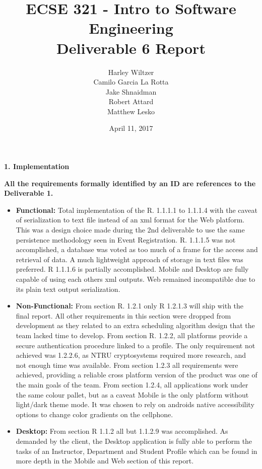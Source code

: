 \documentclass[12pt]{article}
\title{ECSE 321 - Intro to Software Engineering\\Deliverable 6 Report}
\author{Harley Wiltzer\\Camilo Garcia La Rotta\\Jake Shnaidman\\Robert Attard\\Matthew Lesko}
\date{April 11, 2017}
\begin{document}
\maketitle
\newpage
{} %

\newpage
\textbf{1. Implementation}


\textbf{All the requirements formally identified by an ID are references to the Deliverable 1.}
\begin{itemize}

    \item \textbf{Functional:} Total implementation of the R. 1.1.1.1 to 1.1.1.4 with the caveat of serialization to text file instead of an xml format for the Web platform. This was a design choice made during the 2nd deliverable to use the same persistence methodology seen in Event Registration. R. 1.1.1.5 was not accomplished, a database was voted as too much of a frame for the access and retrieval of data. A much lightweight approach of storage in text files was preferred. R 1.1.1.6 is partially accomplished. Mobile and Desktop are fully capable of using each others xml outputs. Web remained incompatible due to its plain text output serialization.
        
	\item \textbf{Non-Functional:} From section R. 1.2.1 only R 1.2.1.3 will ship with the final
		report. All other requirements in this section were dropped from development as they related
		to an extra scheduling algorithm design that the team lacked time to develop.
	From section R. 1.2.2, all platforms provide a secure authentication procedure linked to a
	profile. The only requirement not achieved was 1.2.2.6, as NTRU cryptosystems required more
	research, and not enough time was available. From section 1.2.3 all requirements were achieved,
	providing a reliable cross platform version of the product was one of the main goals of the
	team. From section 1.2.4, all applications work under the same colour pallet, but as a caveat Mobile is
	the only platform without light/dark theme mode. It was chosen to rely on androids native
	accessibility options to change color gradients on the cellphone.
        

	\item \textbf{Desktop:} From section R 1.1.2 all but 1.1.2.9 was accomplished. As demanded by the client, the Desktop application is fully able to perform the tasks of an Instructor, Department and Student Profile which can be found in more depth in the Mobile and Web section of this report.
	

\end{itemize}
\end{document}
